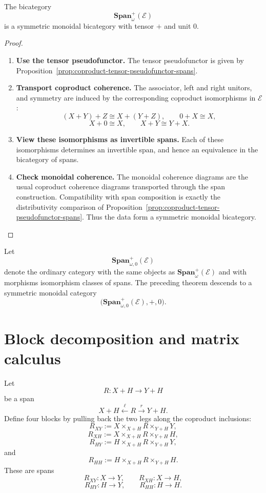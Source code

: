 \begin{theorem}
\label{thm:coproduct-symmetric-monoidal-bicategory-spans}
The bicategory
\[
  \mathbf{Span}^{+}_{\omega}(\mathcal E)
\]
is a symmetric monoidal bicategory with tensor \(+\) and unit \(0\).
\end{theorem}

\begin{proof}
\begin{enumerate}
  \item \textbf{Use the tensor pseudofunctor.}
  The tensor pseudofunctor is given by
  Proposition~\ref{prop:coproduct-tensor-pseudofunctor-spans}.

  \item \textbf{Transport coproduct coherence.}
  The associator, left and right unitors, and symmetry are induced by the
  corresponding coproduct isomorphisms in \(\mathcal E\):
  \[
    (X+Y)+Z\cong X+(Y+Z),
    \qquad
    0+X\cong X,
  \]
  \[
    X+0\cong X,
    \qquad
    X+Y\cong Y+X.
  \]

  \item \textbf{View these isomorphisms as invertible spans.}
  Each of these isomorphisms determines an invertible span, and hence an
  equivalence in the bicategory of spans.

  \item \textbf{Check monoidal coherence.}
  The monoidal coherence diagrams are the usual coproduct coherence diagrams
  transported through the span construction. Compatibility with span
  composition is exactly the distributivity comparison of
  Proposition~\ref{prop:coproduct-tensor-pseudofunctor-spans}. Thus the data
  form a symmetric monoidal bicategory.
\end{enumerate}
\end{proof}

Let
\[
  \mathbf{Span}^{+}_{\omega,0}(\mathcal E)
\]
denote the ordinary category with the same objects as
\(\mathbf{Span}^{+}_{\omega}(\mathcal E)\) and with morphisms isomorphism
classes of spans. The preceding theorem descends to a symmetric monoidal
category
\[
  \bigl(\mathbf{Span}^{+}_{\omega,0}(\mathcal E),+,0\bigr).
\]

\section{Block decomposition and matrix calculus}
\label{sec:block-decomposition-feedback}

Let
\[
  R:X+H\to Y+H
\]
be a span
\[
  X+H\xleftarrow{\ell}R\xrightarrow{r}Y+H.
\]
Define four blocks by pulling back the two legs along the coproduct inclusions:
\[
  R_{XY}:=
  X\times_{X+H}R\times_{Y+H}Y,
\]
\[
  R_{XH}:=
  X\times_{X+H}R\times_{Y+H}H,
\]
\[
  R_{HY}:=
  H\times_{X+H}R\times_{Y+H}Y,
\]
and
\[
  R_{HH}:=
  H\times_{X+H}R\times_{Y+H}H.
\]
These are spans
\[
  R_{XY}:X\to Y,
  \qquad
  R_{XH}:X\to H,
\]
\[
  R_{HY}:H\to Y,
  \qquad
  R_{HH}:H\to H.
\]

